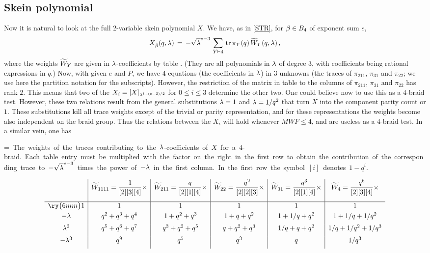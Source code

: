 \subsection{Skein polynomial}

Now it is natural to look at the full 2-variable skein polynomial
$X$. We have, as in \eqref{STR}, for $\beta\in B_4$ of exponent
sum $e$,
\[
X_{\hat{\beta}}(q,\lambda)\,=\,-\sqrt{\lambda}^{e-3}\,
\sum_{Y\vdash 4}\,\text{tr\,}\pi_Y(q)\,\widetilde W_Y(q,\lambda)\,,
\]
where the weights $\widetilde W_Y$ are given in $\lambda$-coefficients by
table . (They are all polynomials in $\lambda$ of
degree $3$, with coefficients being rational expressions in
$q$.) Now, with given $e$ and $P$, we have $4$ equations
(the coefficients in $\lambda$) in $3$ unknowns (the traces of
$\pi_{211}$, $\pi_{31}$ and $\pi_{22}$; we use here the
partition notation for the subscripts). However, the
restriction of the matrix in table  to
the columns of $\pi_{211}$, $\pi_{31}$ and $\pi_{22}$
has rank $2$. This means that two of the $X_i=[X]_{\lambda^
{i+(e-3)/2}}$ for $0\le i\le 3$ determine the other two.
One could believe now to use
this as a 4-braid test. However, these two relations
result from the general substitutions $\lambda=1$ and $\lambda=1/q^2$
that turn $X$ into the component parity count or $1$.
These substitutions kill all trace weights except of the trivial
or parity representation, and for these representations the weights
become also independent on the braid group. Thus the
relations between the $X_i$ will hold whenever $MWF\le 4$,
and are useless as a 4-braid test. In a similar vein, one has 

\newbox\@tempboxb
\setbox\@tempboxb=\hbox{
\capt The weights of the traces contributing to the
$\lambda$-coefficients of $X$ for a $4$-braid. Each table entry
must be multiplied with the factor on the right in the
first row to obtain the contribution of the corresponding trace
to $-\sqrt{\lambda}^{e-3}$ times the power of $-\lambda$ in the
first column. In the first row the symbol $[i]$ denotes $1-q^i$.}

\begin{table}
\[
\begin{array}{c*5{|c}}
& 
\ds \tW_{1111}=\frac{1}{[2][3][4]}\times &
\ds \tW_{211}=\frac{q}{[2][1][4]}\times &
\ds \tW_{22}=\frac{q^2}{[2][2][3]}\times &
\ds \tW_{31}=\frac{q^3}{[2][1][4]}\times &
\ds \tW_{4}=\frac{q^6}{[2][3][4]}\times \\[5mm]
\hline
\ry{6mm}
\ds 1 & 1 & 1 & 1 & 1 & 1 \\[1mm]
-\lm  & q^2+q^3+q^4 & 1+q^2+q^3   & 1+q+q^2   & 1+1/q+q^2 & 1+1/q+1/q^2 \\[2mm]
\lm^2 & q^5+q^6+q^7 & q^3+q^2+q^5 & q+q^2+q^3 & 1/q+q+q^2 & 1/q+1/q^2+1/q^3 \\[2mm]
-\lm^3& q^9         & q^5         & q^3       & q         & 1/q^3 \\[2mm]
\end{array}
\]
\caption{\unhbox\@tempboxb
\label{table1}}
\end{table}


